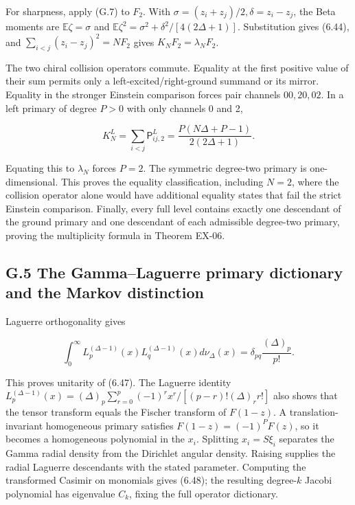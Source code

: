 \documentclass[a4paper,11pt]{article}
\numberwithin{equation}{section}
\begin{document}
For sharpness, apply (G.7) to \(F_2\). With \(\sigma=(z_i+z_j)/2,\delta=z_i-z_j\), the Beta moments are \(\mathbb E\zeta=\sigma\) and \(\mathbb E\zeta^2=\sigma^2+\delta^2/[4(2\Delta+1)]\). Substitution gives (6.44), and \(\sum_{i<j}(z_i-z_j)^2=NF_2\) gives \(K_NF_2=\lambda_NF_2\).

The two chiral collision operators commute. Equality at the first positive value of their sum permits only a left-excited/right-ground summand or its mirror. Equality in the stronger Einstein comparison forces pair channels \(00,20,02\). In a left primary of degree \(P>0\) with only channels 0 and 2,

\[
K_N^L=\sum_{i<j}\mathsf P_{ij,2}^L
=\frac{P(N\Delta+P-1)}{2(2\Delta+1)}.
\tag{G.10}
\]

Equating this to \(\lambda_N\) forces \(P=2\). The symmetric degree-two primary is one-dimensional. This proves the equality classification, including \(N=2\), where the collision operator alone would have additional equality states that fail the strict Einstein comparison. Finally, every full level contains exactly one descendant of the ground primary and one descendant of each admissible degree-two primary, proving the multiplicity formula in Theorem EX-06.

\hypertarget{g.5-the-gammalaguerre-primary-dictionary-and-the-markov-distinction}{%
\subsection{G.5 The Gamma--Laguerre primary dictionary and the Markov distinction}\label{g.5-the-gammalaguerre-primary-dictionary-and-the-markov-distinction}}

Laguerre orthogonality gives

\[
\int_0^\infty L_p^{(\Delta-1)}(x)L_q^{(\Delta-1)}(x)d\nu_\Delta(x)
=\delta_{pq}\frac{(\Delta)_p}{p!}.
\tag{G.11}
\]

This proves unitarity of (6.47). The Laguerre identity \(L_p^{(\Delta-1)}(x)=(\Delta)_p\sum_{r=0}^p(-1)^rx^r/[ (p-r)!(\Delta)_r r!]\) also shows that the tensor transform equals the Fischer transform of \(F(1-z)\). A translation-invariant homogeneous primary satisfies \(F(1-z)=(-1)^PF(z)\), so it becomes a homogeneous polynomial in the \(x_i\). Splitting \(x_i=S\xi_i\) separates the Gamma radial density from the Dirichlet angular density. Raising supplies the radial Laguerre descendants with the stated parameter. Computing the transformed Casimir on monomials gives (6.48); the resulting degree-\(k\) Jacobi polynomial has eigenvalue \(C_k\), fixing the full operator dictionary.
\end{document}
